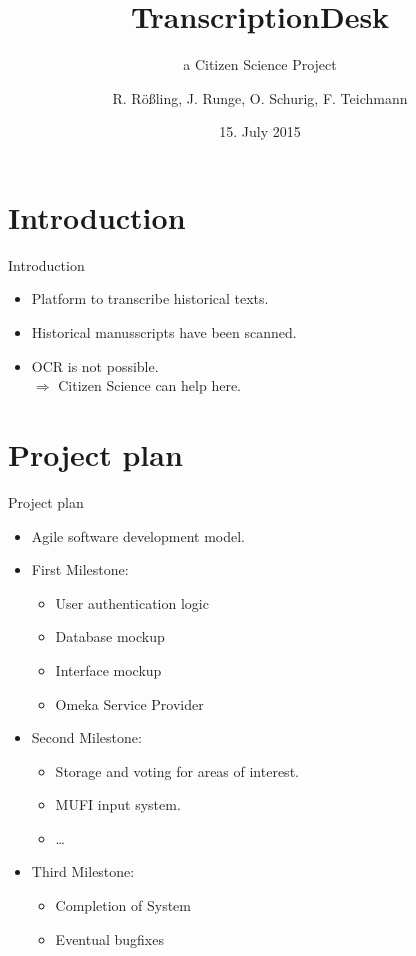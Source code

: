 \documentclass[xcolor=dvipsnames]{beamer}
\title{TranscriptionDesk}
\subtitle{a Citizen Science Project}
\author{R. Rößling, J. Runge, O. Schurig, F. Teichmann}
\institute{University of Leipzig}
\date{15. July 2015}
\begin{document}
\frame{\titlepage}
\frame{\tableofcontents}

\section{Introduction}
\begin{frame}{Introduction}
    \begin{itemize}
        \item Platform to transcribe historical texts.
        \item Historical manusscripts have been scanned.
        \item OCR is not possible.
        \\$\Rightarrow$ Citizen Science can help here.
    \end{itemize}
\end{frame}
\section{Project plan}
\begin{frame}{Project plan}
    \begin{itemize}
        \item Agile software development model.
        \item First Milestone:
        \begin{itemize}
            \item User authentication logic \checkmark
            \item Database mockup \checkmark
            \item Interface mockup \checkmark
            \item Omeka Service Provider \checkmark
        \end{itemize}
        \item Second Milestone:
        \begin{itemize}
            \item Storage and voting for areas of interest.
            \item MUFI input system.
            \item …
        \end{itemize}
        \item Third Milestone:
        \begin{itemize}
            \item Completion of System
            \item Eventual bugfixes
        \end{itemize}
    \end{itemize}
\end{frame}
\end{document}
